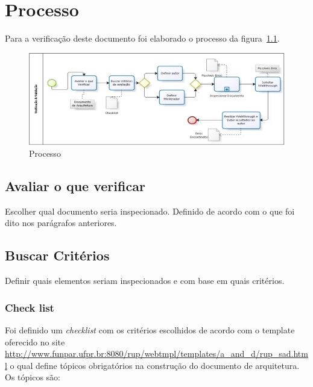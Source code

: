 \chapter{Processo}

Para a verificação deste documento foi elaborado o processo da figura~\ref{fig:processo}.


\begin{figure}[H]
  \center
  \includegraphics[width=1\textwidth]{figuras/processo.png}
  \caption{Processo}
  \label{fig:processo}
\end{figure}

\section{Avaliar o que verificar}

Escolher qual documento seria inspecionado. Definido de acordo com o que foi dito nos parágrafos anteriores. 

\section{Buscar Critérios}

Definir quais elementos seriam inspecionados e com base em quais critérios. 

    \subsection{Check list}
    Foi definido um \textit{checklist} com os critérios escolhidos de acordo com o template oferecido no site \url{http://www.funpar.ufpr.br:8080/rup/webtmpl/templates/a_and_d/rup_sad.html} o qual define tópicos obrigatórios na construção do documento de arquitetura. Os tópicos são: 

